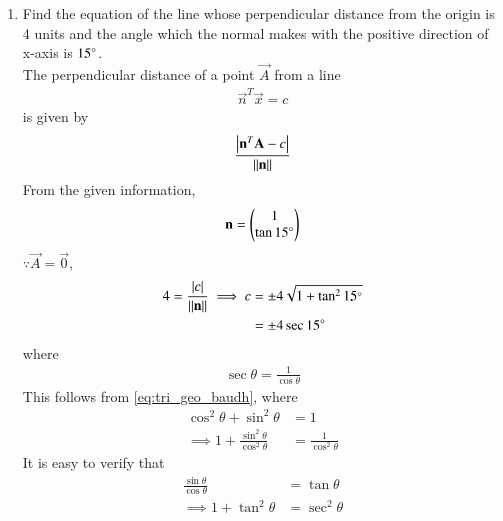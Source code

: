 \begin{enumerate}[label=\arabic*.,ref=\thesubsection.\theenumi]
\item Find the equation of the line whose perpendicular distance from the origin is 4 units and the angle which the normal makes with the positive direction of x-axis is $15\degree$.
%
\\
\solution  The perpendicular distance of a point $\vec{A}$ from a line
\begin{align}
\vec{n}^T\vec{x} = c
\end{align}
%
is given by 
\begin{align}
\label{eq:line_pt_dist}
\frac{\left\vert\mathbf{n}^T\mathbf{A} - c\right\vert}{\left\lVert\mathbf{n}\right\rVert}
\end{align}
%
From the given information, 
\begin{align}
\mathbf{n} = \begin{pmatrix}1\\\tan 15\degree\end{pmatrix}
\end{align}
%
$\because \vec{A} = \vec{0}$, 
\begin{align}
4 = \frac{\left\vert c\right\vert}{\left\lVert\mathbf{n}\right\rVert} \implies c &= \pm 4\sqrt{1+\tan^2 15\degree} 
\\
&= \pm 4 \sec 15\degree
\end{align}
%
where 
%
\begin{align}
\sec \theta = \frac{1}{\cos \theta}
\end{align}
%
This follows from \eqref{eq:tri_geo_baudh}, where
%
\begin{align}
\cos^2 \theta + \sin^2 \theta &= 1
\\
\implies 1 + \frac{\sin^2 \theta}{\cos^2 \theta} &= \frac{1}{\cos^2 \theta}
\end{align}
%
It is easy to verify that 
%
\begin{align}
\frac{\sin \theta}{\cos \theta} &= \tan \theta
\\
\implies 1 + \tan^2 \theta &= \sec^2 \theta
\end{align}
%


\end{enumerate}
